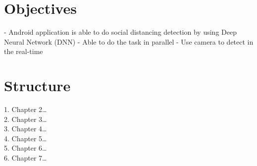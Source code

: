     \section{Objectives}
        -	Android application is able to do social distancing detection by using Deep Neural Network (DNN)
        -	Able to do the task in parallel
        -	Use camera to detect in the real-time

    \section{Structure}
        1.	Chapter 2… \\
        2.	Chapter 3… \\
        3.	Chapter 4… \\
        4.	Chapter 5… \\
        5.	Chapter 6… \\
        6.	Chapter 7… \\
